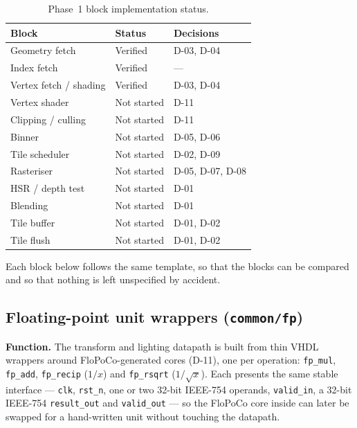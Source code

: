 \documentclass[11pt,a4paper]{article}
\newcommand{\field}[1]{\textbf{#1}\quad}
\begin{document}
\begin{table}[ht]
\centering
\begin{tabular}{@{}lll@{}}
\toprule
\textbf{Block} & \textbf{Status} & \textbf{Decisions} \\
\midrule
Geometry fetch         & Verified    & D-03, D-04 \\
\quad Index fetch      & Verified    & --- \\
\quad Vertex fetch / shading & Verified & D-03, D-04 \\
Vertex shader          & Not started & D-11 \\
Clipping / culling     & Not started & D-11 \\
Binner                 & Not started & D-05, D-06 \\
Tile scheduler         & Not started & D-02, D-09 \\
Rasteriser             & Not started & D-05, D-07, D-08 \\
HSR / depth test       & Not started & D-01 \\
Blending               & Not started & D-01 \\
Tile buffer            & Not started & D-01, D-02 \\
Tile flush             & Not started & D-01, D-02 \\
\bottomrule
\end{tabular}
\caption{Phase~1 block implementation status.}
\label{tab:blocks}
\end{table}

Each block below follows the same template, so that the blocks can be compared
and so that nothing is left unspecified by accident.

\subsection{Floating-point unit wrappers (\texttt{common/fp})}
\field{Function.} The transform and lighting datapath is built from thin VHDL
wrappers around FloPoCo-generated cores (D-11), one per operation:
\texttt{fp\_mul}, \texttt{fp\_add}, \texttt{fp\_recip} ($1/x$) and
\texttt{fp\_rsqrt} ($1/\sqrt{x}$). Each presents the same stable interface ---
\texttt{clk}, \texttt{rst\_n}, one or two 32-bit IEEE-754 operands,
\texttt{valid\_in}, a 32-bit IEEE-754 \texttt{result\_out} and
\texttt{valid\_out} --- so the FloPoCo core inside can later be swapped for a
hand-written unit without touching the datapath.
\end{document}
